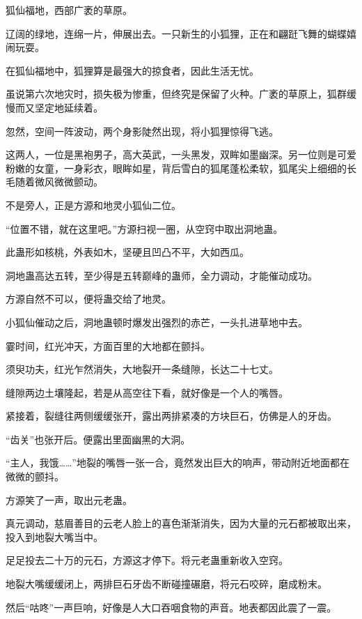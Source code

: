 
\begin{this_body}



狐仙福地，西部广袤的草原。

辽阔的绿地，连绵一片，伸展出去。一只新生的小狐狸，正在和翩跹飞舞的蝴蝶嬉闹玩耍。

在狐仙福地中，狐狸算是最强大的掠食者，因此生活无忧。

虽说第六次地灾时，损失极为惨重，但终究是保留了火种。广袤的草原上，狐群缓慢而又坚定地延续着。

忽然，空间一阵波动，两个身影陡然出现，将小狐狸惊得飞逃。

这两人，一位是黑袍男子，高大英武，一头黑发，双眸如墨幽深。另一位则是可爱粉嫩的女童，一身彩衣，眼眸如星，背后雪白的狐尾蓬松柔软，狐尾尖上细细的长毛随着微风微微颤动。

不是旁人，正是方源和地灵小狐仙二位。

“位置不错，就在这里吧。”方源扫视一圈，从空窍中取出洞地蛊。

此蛊形如核桃，外表如木，坚硬且凹凸不平，大如西瓜。

洞地蛊高达五转，至少得是五转巅峰的蛊师，全力调动，才能催动成功。

方源自然不可以，便将蛊交给了地灵。

小狐仙催动之后，洞地蛊顿时爆发出强烈的赤芒，一头扎进草地中去。

霎时间，红光冲天，方面百里的大地都在颤抖。

须臾功夫，红光乍然消失，大地裂开一条缝隙，长达二十七丈。

缝隙两边土壤隆起，若是从高空往下看，就好像是一个人的嘴唇。

紧接着，裂缝往两侧缓缓张开，露出两排紧凑的方块巨石，仿佛是人的牙齿。

“齿关”也张开后。便露出里面幽黑的大洞。

“主人，我饿……”地裂的嘴唇一张一合，竟然发出巨大的响声，带动附近地面都在微微的颤抖。

方源笑了一声，取出元老蛊。

真元调动，慈眉善目的云老人脸上的喜色渐渐消失，因为大量的元石都被取出来，投入到地裂大嘴当中。

足足投去二十万的元石，方源这才停下。将元老蛊重新收入空窍。

地裂大嘴缓缓闭上，两排巨石牙齿不断碰撞碾磨，将元石咬碎，磨成粉末。

然后“咕咚”一声巨响，好像是人大口吞咽食物的声音。地表都因此震了一震。


\end{this_body}
